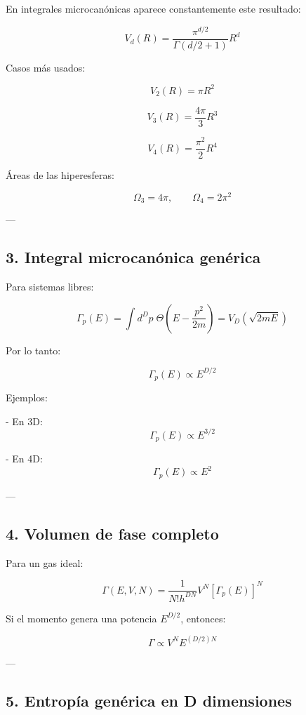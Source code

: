\documentclass{article}
\begin{document}
En integrales microcanónicas aparece constantemente este resultado:

\[
\boxed{
V_{d}(R) = \frac{\pi^{d/2}}{\Gamma(d/2 + 1)} R^{d}
}
\]

Casos más usados:

\[
V_{2}(R) = \pi R^{2}
\]

\[
V_{3}(R) = \frac{4\pi}{3}R^{3}
\]

\[
V_{4}(R) = \frac{\pi^{2}}{2}R^{4}
\]

Áreas de las hiperesferas:

\[
\Omega_{3} = 4\pi,\qquad \Omega_{4} = 2\pi^{2}
\]

---

\subsection*{\textcolor{Apple Green}{3. Integral microcanónica genérica}}

Para sistemas libres:

\[
\Gamma_{p}(E)
= \int d^{D}p \;\Theta\!\left(E-\frac{p^{2}}{2m}\right)
= V_{D}\!\left(\sqrt{2mE}\right)
\]

Por lo tanto:

\[
\boxed{
\Gamma_{p}(E) \propto E^{D/2}
}
\]

Ejemplos:

- En 3D:
  \[
  \Gamma_{p}(E) \propto E^{3/2}
  \]

- En 4D:
  \[
  \Gamma_{p}(E) \propto E^{2}
  \]

---

\subsection*{\textcolor{Apple Green}{4. Volumen de fase completo}}

Para un gas ideal:

\[
\boxed{
\Gamma(E,V,N) =
\frac{1}{N! h^{DN}}
V^{N}
\left[\Gamma_{p}(E)\right]^{N}
}
\]

Si el momento genera una potencia \(E^{D/2}\), entonces:

\[
\Gamma \propto
V^{N} E^{(D/2)N}
\]

---

\subsection*{\textcolor{Apple Green}{5. Entropía genérica en D dimensiones}}
\end{document}
